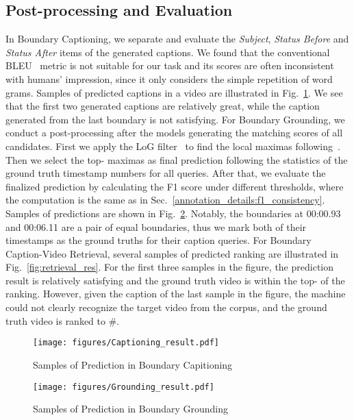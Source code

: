 \documentclass[runningheads]{llncs}
\begin{document}
\subsection{Post-processing and Evaluation}

In Boundary Captioning, we separate and evaluate the \textit{Subject}, \textit{Status Before} and \textit{Status After} items of the generated captions. We found that the conventional BLEU~\cite{papineni-etal-2002-bleu} metric is not suitable for our task and its scores are often inconsistent with humans’ impression, since it only considers the simple repetition of word grams. Samples of predicted captions in a video are illustrated in Fig.~\ref{fig:captioning_res}. We see that the first two generated captions are relatively great, while the caption generated from the last boundary is not satisfying.
For Boundary Grounding, we conduct a post-processing after the models generating the matching scores of all candidates. First we apply the LoG filter~\cite{lindeberg1998feature} to find the local maximas following~\cite{shou2021generic}. Then we select the top- maximas as final prediction following the statistics of the ground truth timestamp numbers for all queries. After that, we evaluate the finalized prediction by calculating the F1 score under different thresholds, where the computation is the same as in Sec.~\ref{annotation_details:f1_consistency}. Samples of predictions are shown in Fig.~\ref{fig:grounding_res}. Notably, the boundaries at 00:00.93 and 00:06.11 are a pair of equal boundaries, thus we mark both of their timestamps as the ground truths for their caption queries.
For Boundary Caption-Video Retrieval, several samples of predicted ranking are illustrated in Fig.~\ref{fig:retrieval_res}. For the first three samples in the figure, the prediction result is relatively satisfying and the ground truth video is within the top- of the ranking. However, given the caption of the last sample in the figure, the machine could not clearly recognize the target video from the corpus, and the ground truth video is ranked to \#.




\begin{figure}[t]
\centering
\texttt{[image: figures/Captioning\_result.pdf]}
\setlength{\abovecaptionskip}{0.9cm}
\caption{Samples of Prediction in Boundary Capitioning}
\label{fig:captioning_res}
\end{figure}

\begin{figure}[t]
\centering
\texttt{[image: figures/Grounding\_result.pdf]}
\setlength{\abovecaptionskip}{0.9cm}
\caption{Samples of Prediction in Boundary Grounding}
\label{fig:grounding_res}
\end{figure}
\end{document}
